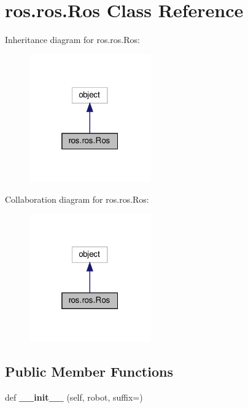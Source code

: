 \hypertarget{classros_1_1ros_1_1Ros}{}\section{ros.\+ros.\+Ros Class Reference}
\label{classros_1_1ros_1_1Ros}


Inheritance diagram for ros.\+ros.\+Ros\+:
\nopagebreak
\begin{figure}[H]
\begin{center}
\leavevmode
\includegraphics[width=148pt]{classros_1_1ros_1_1Ros__inherit__graph}
\end{center}
\end{figure}


Collaboration diagram for ros.\+ros.\+Ros\+:
\nopagebreak
\begin{figure}[H]
\begin{center}
\leavevmode
\includegraphics[width=148pt]{classros_1_1ros_1_1Ros__coll__graph}
\end{center}
\end{figure}
\subsection*{Public Member Functions}
\begin{DoxyCompactItemize}
\item 
\mbox{\label{classros_1_1ros_1_1Ros_afc21e7cd18df42d888198438e6a0fe6d}} 
def {\bfseries \+\_\+\+\_\+init\+\_\+\+\_\+} (self, robot, suffix=\textquotesingle{}\textquotesingle{})
\end{DoxyCompactItemize}
